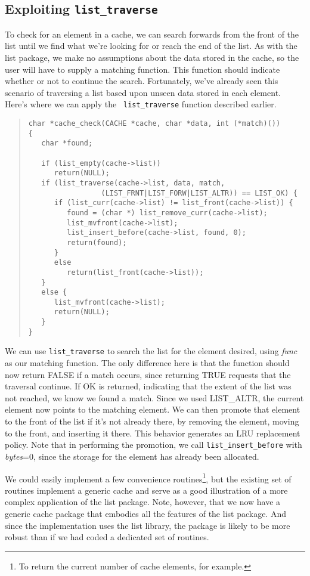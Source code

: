 \subsection{Exploiting {\tt list\_traverse}}
To check for an element in a cache, we can search forwards from the front of
the list until we find what we're looking for or reach the end of the list.
As with the list package, we make no assumptions about the data stored in the
cache, so the user will have to supply a matching function.  This function
should indicate whether or not to continue the search.
Fortunately, we've already seen this scenario of traversing a list based upon
unseen data stored in each element.  Here's where we can apply the {\tt
list\_traverse} function described earlier.
\begin{quote}
\begin{verbatim}
char *cache_check(CACHE *cache, char *data, int (*match)())
{
   char *found;

   if (list_empty(cache->list))
      return(NULL);
   if (list_traverse(cache->list, data, match,
	             (LIST_FRNT|LIST_FORW|LIST_ALTR)) == LIST_OK) {
      if (list_curr(cache->list) != list_front(cache->list)) {
         found = (char *) list_remove_curr(cache->list);
         list_mvfront(cache->list);
         list_insert_before(cache->list, found, 0);
         return(found);
      }
      else
         return(list_front(cache->list));
   }
   else {
      list_mvfront(cache->list);
      return(NULL);
   }
}
\end{verbatim}
\end{quote}

We can use {\tt list\_traverse} to search the list for the element desired,
using {\em func} as our matching function.  The only difference here is that
the function should now return FALSE if a match occurs, since returning TRUE
requests that the traversal continue.  If OK is returned, indicating that the
extent of the list was not reached, we know we found a match.  Since we used
LIST\_ALTR, the current element now points to the matching element.  We can
then promote that element to the front of the list if it's not already there,
by removing the element, moving to the front, and inserting it there.  This
behavior generates an LRU replacement policy.  Note that in performing the
promotion, we call {\tt list\_insert\_before} with {\em bytes}=0, since the
storage for the element has already been allocated.

We could easily implement a few convenience routines\footnote{To return the
current number of cache elements, for example.}, but the existing set of
routines implement a generic cache and serve as a good illustration of a more
complex application of the list package.  Note, however, that we now have a
generic cache package that embodies all the features of the list package.  And
since the implementation uses the list library, the package is likely to be
more robust than if we had coded a dedicated set of routines.



